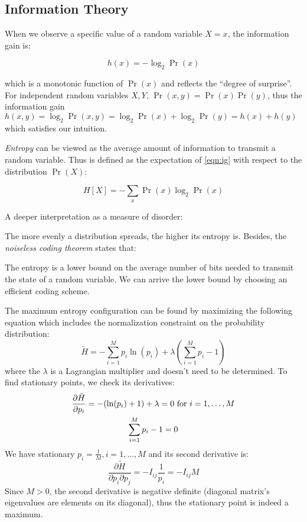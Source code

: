\subsection{Information Theory}
When we observe a specific value of a random variable $X=x$, the
information gain is:
\begin{definition}
\begin{equation}
h(x)=-\log_{2}\Pr(x)
\label{eqn:ig}
\end{equation}
\end{definition}
which is a monotonic function of $\Pr(x)$ and reflects the ``degree of
surprise''. For independent random variables $X,Y$,
    $\Pr(x,y)=\Pr(x)\Pr(y)$, thus the information gain
    $h(x,y)=\log_{2}\Pr(x,y)=\log_{2}\Pr(x)+\log_{2}\Pr(y)=h(x)+h(y)$
    which satisfies our intuition.


\emph{Entropy} can be viewed as the average amount of information to transmit
a random variable. Thus is defined as the expectation of
\eqref{eqn:ig} with respect to the distribution $\Pr(X)$:
\begin{definition}
\begin{equation}
H[X]=-\sum_{x}\Pr(x)\log_{2}\Pr(x)
\label{eqn:entropy}
\end{equation}
\end{definition}
A deeper interpretation as a measure of disorder:


The more evenly a distribution spreads, the higher its entropy is.
Besides, the \emph{noiseless coding theorem} states that:
\begin{conclusion}
The entropy is a lower bound on the average number of bits needed to transmit
the state of a random variable. We can arrive the lower bound by
choosing an efficient coding scheme.
\end{conclusion}
The maximum entropy configuration can be found by maximizing the following
equation which includes the normalization constraint on the
probability distribution:
\begin{equation}
\tilde{H}=-\sum_{i=1}^{M}p_{i}\ln(p_{i})+\lambda(\sum_{i=1}^{M}p_{i}-1)
\label{eqn:tildeh}
\end{equation}
where the $\lambda$ is a Lagrangian multiplier and doesn't need to be 
determined. To find stationary points, we check its derivatives:
\begin{gather}
\frac{\partial{}\tilde{H}}{\partial{}p_{i}}=-(\ln(p_{i})+1)+\lambda=0\text{~for~}i=1,\ldots,M\notag\\
\sum_{i=1}^{M}p_{i}-1=0\notag
\end{gather}
We have stationary $p_{i}=\frac{1}{M},i=1,\ldots,M$ and its second
derivative is:
\begin{equation}
\frac{\partial{}\tilde{H}}{\partial{}p_{i}\partial{}p_{j}}=-I_{ij}\frac{1}{p_i}=-I_{ij}M
\label{eqn:sd}
\end{equation}
Since $M>0$, the second derivative is negative definite (diagonal
        matrix's eigenvalues are elements on its diagonal), thus the
stationary point is indeed a maximum.


